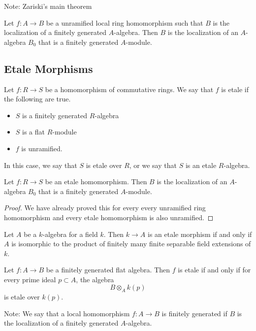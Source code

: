 \documentclass[a4paper]{article}
\begin{document}
Note: Zariski's main theorem

\begin{prp}{}{} Let $f:A\to B$ be a unramified local ring homomorphism such that $B$ is the localization of a finitely generated $A$-algebra. Then $B$ is the localization of an $A$-algebra $B_0$ that is a finitely generated $A$-module. 
\end{prp}

\subsection{Etale Morphisms}
\begin{defn}{}{} Let $f:R\to S$ be a homomorphism of commutative rings. We say that $f$ is etale if the following are true. 
\begin{itemize}
\item $S$ is a finitely generated $R$-algebra
\item $S$ is a flat $R$-module
\item $f$ is unramified. 
\end{itemize}
In this case, we say that $S$ is etale over $R$, or we say that $S$ is an etale $R$-algebra. 
\end{defn}

\begin{crl}{}{} Let $f:R\to S$ be an etale homomorphism. Then $B$ is the localization of an $A$-algebra $B_0$ that is a finitely generated $A$-module. \tcbline
\begin{proof}
We have already proved this for every every unramified ring homomorphism and every etale homomorphism is also unramified. 
\end{proof}
\end{crl}

\begin{prp}{}{} Let $A$ be a $k$-algebra for a field $k$. Then $k\to A$ is an etale morphism if and only if $A$ is isomorphic to the product of finitely many finite separable field extensions of $k$. 
\end{prp}

\begin{prp}{}{} Let $f:A\to B$ be a finitely generated flat algebra. Then $f$ is etale if and only if for every prime ideal $p\subset A$, the algebra $$B\otimes_A k(p)$$ is etale over $k(p)$. 
\end{prp}

Note: We say that a local homomorphism $f:A\to B$ is finitely generated if $B$ is the localization of a finitely generated $A$-algebra. 
\end{document}
